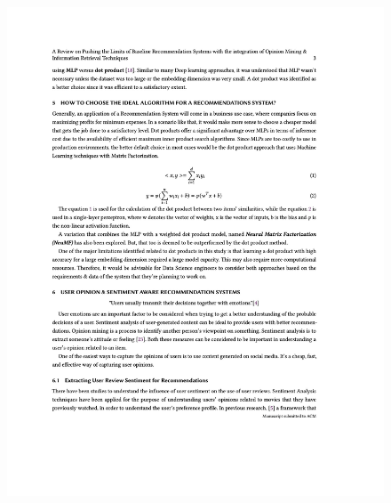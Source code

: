 \begin{figure}[h!]
\centering
\includegraphics[width=\textwidth]{images/appendix/papers/review/A Review on Pushing the Limits of Baseline Recommendation Systems with the integration of Opinion Mining & Information Retrieval Techniques 3.jpeg}
\end{figure}

